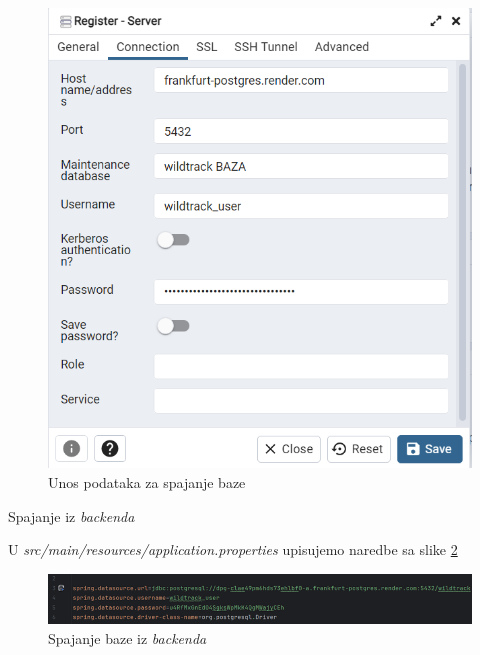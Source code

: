 \begin{packed_enum}
			\begin{figure}[H]
				\includegraphics[scale=1]{slike/postavljanje baze3.png}
				\centering
				\caption{Unos podataka za spajanje baze}
				\label{fig:postavljanje baze3}
			\end{figure}

			\item Spajanje iz \textit{backenda}
			\begin{packed_item}
				\item U \textit{src/main/resources/application.properties} upisujemo naredbe sa slike \ref{fig:postavljanje baze4}
			\end{packed_item}
			
			\begin{figure}[H]
				\includegraphics[scale=1]{slike/postavljanje baze4.png}
				\centering
				\caption{Spajanje baze iz \textit{backenda}}
				\label{fig:postavljanje baze4}
			\end{figure}


			\end{packed_enum}

